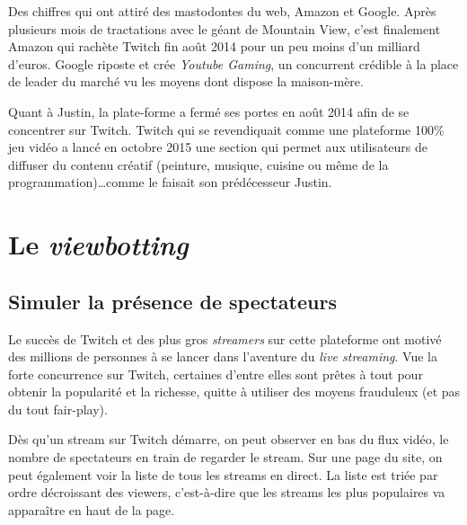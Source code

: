 \documentclass[a4paper]{article}
\begin{document}
Des chiffres qui ont attiré des mastodontes du web, Amazon et Google. Après plusieurs mois de tractations avec le géant de Mountain View, c'est finalement Amazon qui rachète Twitch fin août 2014 pour un peu moins d'un milliard d'euros. Google riposte et crée \textit{Youtube Gaming}, un concurrent crédible à la place de leader du marché vu les moyens dont dispose la maison-mère\cite{Echos2015}.

Quant à Justin, la plate-forme a fermé ses portes en août 2014 afin de se concentrer sur Twitch. Twitch qui se revendiquait comme une plateforme 100\% jeu vidéo a lancé en octobre 2015 une section qui permet aux utilisateurs de diffuser du contenu créatif (peinture, musique, cuisine ou même de la programmation)\ldots comme le faisait son prédécesseur Justin. 

\section{Le \textit{viewbotting}}

\subsection{Simuler la présence de spectateurs}

Le succès de Twitch et des plus gros \textit{streamers} sur cette plateforme ont motivé des millions de personnes à se lancer dans l'aventure du \textit{live streaming}. Vue la forte concurrence sur Twitch, certaines d'entre elles sont prêtes à tout pour obtenir la popularité et la richesse, quitte à utiliser des moyens frauduleux (et pas du tout fair-play).

Dès qu'un stream sur Twitch démarre, on peut observer en bas du flux vidéo, le nombre de spectateurs en train de regarder le stream. Sur une page du site, on peut également voir la liste de tous les streams en direct. La liste est triée par ordre décroissant des viewers, c'est-à-dire que les streams les plus populaires va apparaître en haut de la page.

\end{document}
